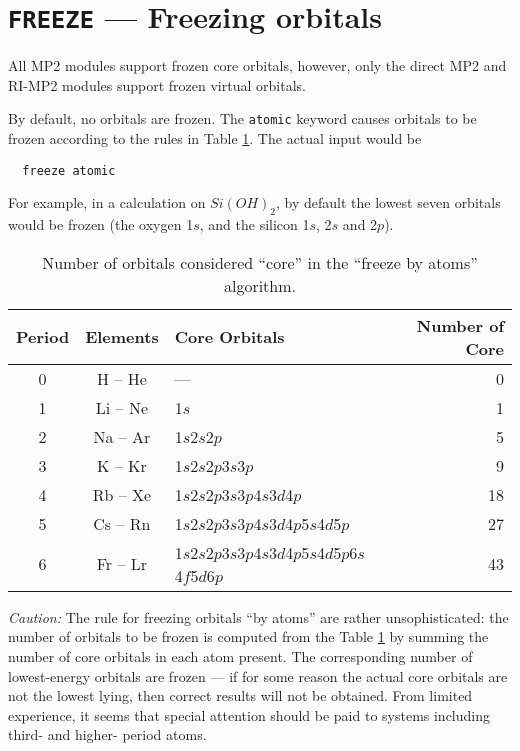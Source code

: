 \section{{\tt FREEZE} --- Freezing orbitals}
\label{mp2:core}

All MP2 modules support frozen core orbitals, however, only the direct
MP2 and RI-MP2 modules support frozen virtual orbitals. 

By default, no orbitals are frozen.  The \verb+atomic+ keyword causes
orbitals to be frozen according to the rules in Table
\ref{tbl:freeze-by-atoms}.  The actual input would be
\begin{verbatim}
  freeze atomic
\end{verbatim}
For example, in a calculation on $Si(OH)_2$, by default the lowest
seven orbitals would be frozen (the oxygen 1$s$, and the silicon 1$s$,
2$s$ and 2$p$).

\begin{table}[htbp]
\label{tbl:freeze-by-atoms}

\center

\begin{tabular}{cclr}
\hline\hline
Period & Elements & Core Orbitals & Number of Core \\
\hline
0 & H -- He  & ---                                          &  0 \\
1 & Li -- Ne & 1$s$                                         &  1 \\
2 & Na -- Ar & 1$s$2$s$2$p$                                 &  5 \\
3 & K -- Kr  & 1$s$2$s$2$p$3$s$3$p$                         &  9 \\
4 & Rb -- Xe & 1$s$2$s$2$p$3$s$3$p$4$s$3$d$4$p$             & 18 \\
5 & Cs -- Rn & 1$s$2$s$2$p$3$s$3$p$4$s$3$d$4$p$5$s$4$d$5$p$ & 27 \\
6 & Fr -- Lr & 1$s$2$s$2$p$3$s$3$p$4$s$3$d$4$p$5$s$4$d$5$p$6$s$4$f$5$d$6$p$
     & 43 \\
\hline\hline
\end{tabular}

\caption{Number of orbitals considered ``core'' in the ``freeze by
atoms'' algorithm.}

\end{table}

{\em Caution:\/} The rule for freezing orbitals ``by atoms'' are
rather unsophisticated: the number of orbitals to be frozen is
computed from the Table \ref{tbl:freeze-by-atoms} by summing the number
of core orbitals in each atom present.  The corresponding number of
lowest-energy orbitals are frozen --- if for some reason the actual
core orbitals are not the lowest lying, then correct results will not
be obtained.  From limited experience, it seems that special attention
should be paid to systems including third- and higher- period atoms.

